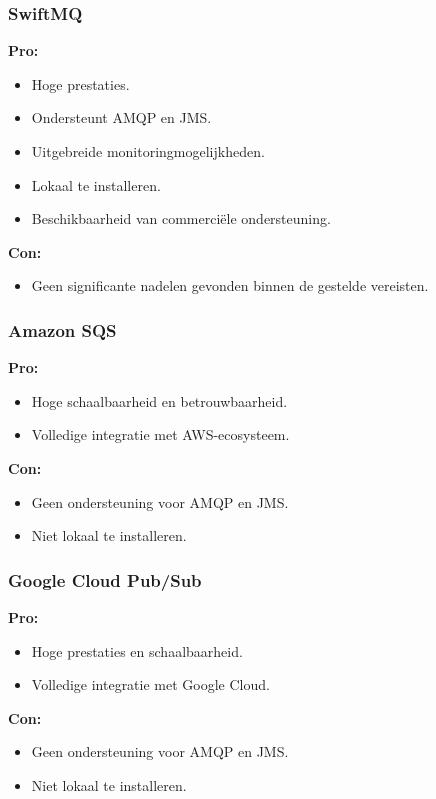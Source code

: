 \subsubsection{SwiftMQ}
\textbf{Pro:}
\begin{itemize}
    \item Hoge prestaties.
    \item Ondersteunt AMQP en JMS.
    \item Uitgebreide monitoringmogelijkheden.
    \item Lokaal te installeren.
    \item Beschikbaarheid van commerciële ondersteuning.
\end{itemize}
\textbf{Con:}
\begin{itemize}
    \item Geen significante nadelen gevonden binnen de gestelde vereisten.
\end{itemize}

\subsubsection{Amazon SQS}
\textbf{Pro:}
\begin{itemize}
    \item Hoge schaalbaarheid en betrouwbaarheid.
    \item Volledige integratie met AWS-ecosysteem.
\end{itemize}
\textbf{Con:}
\begin{itemize}
    \item Geen ondersteuning voor AMQP en JMS.
    \item Niet lokaal te installeren.
\end{itemize}

\subsubsection{Google Cloud Pub/Sub}
\textbf{Pro:}
\begin{itemize}
    \item Hoge prestaties en schaalbaarheid.
    \item Volledige integratie met Google Cloud.
\end{itemize}
\textbf{Con:}
\begin{itemize}
    \item Geen ondersteuning voor AMQP en JMS.
    \item Niet lokaal te installeren.
\end{itemize}

